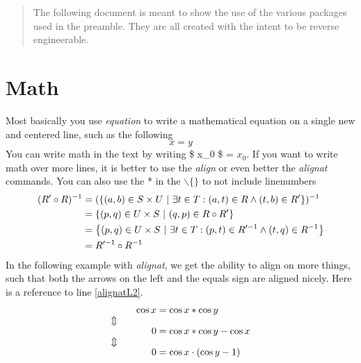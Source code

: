 \documentclass[a4, english, twoside]{article}
\begin{document}
\maketitle

\begin{abstract}
The following document is meant to show the use of the various packages used in the preamble. They are all created with the intent to be reverse engineerable.
\end{abstract}

\tableofcontents

\newpage
\section{Math} \label{sec:math}
Most basically you use \emph{equation} to write a mathematical equation on a single new and centered line, such as the following
\begin{equation}
	x = y
\end{equation}
You can write math in the text by writing \$ x\_0 \$ = $x_0$. If you want to write math over more lines, it is better to use the \emph{align} or even better the \emph{alignat} commands. You can also use the * in the $\backslash$$\{$$\}$ to not include linenumbers
\begin{align*}
	(R' \circ R)^{-1}
		&= (\set{(a,b) \in S \times U}{\exists t \in T: (a,t) \in R \wedge (t,b) \in R'})^{-1}
\\
		&= \set{(p,q) \in U \times S}{(q,p) \in R \circ R'}
\\
		&= \set{(p,q) \in U \times S}{\exists t \in T : (p,t) \in R'^{-1} \wedge (t,q) \in R^{-1}}
\\
		&= R'^{-1} \circ R^{-1}
\end{align*}
In the following example with \emph{alignat}, we get the ability to align on more things, such that both the arrows on the left and the equals sign are aligned nicely. Here is a reference to line \ref{alignatL2}.
\begin{alignat}{2}
    && \cos x &= \cos x * \cos y \label{alignatL1}
\\ \ArrowBetweenLines
    && 0 &= \cos x * \cos y - \cos x \label{alignatL2}
\\ \ArrowBetweenLines
    && 0 &= \cos x \cdot (\cos y - 1) \label{alignatL3}
\end{alignat}
\end{document}
